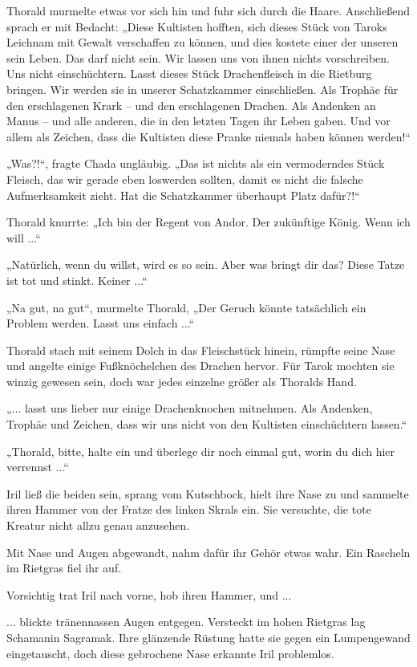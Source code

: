 Thorald murmelte etwas vor sich hin und fuhr sich durch die Haare. Anschließend sprach er mit Bedacht: „Diese Kultisten hofften, sich dieses Stück von Taroks Leichnam mit Gewalt verschaffen zu können, und dies kostete einer der unseren sein Leben. Das darf nicht sein. Wir lassen uns von ihnen nichts vorschreiben. Uns nicht einschüchtern. Lasst dieses Stück Drachenfleisch in die Rietburg bringen. Wir werden sie in unserer Schatzkammer einschließen. Als Trophäe für den erschlagenen Krark – und den erschlagenen Drachen. Als Andenken an Manus – und alle anderen, die in den letzten Tagen ihr Leben gaben. Und vor allem als Zeichen, dass die Kultisten diese Pranke niemals haben können werden!“

„Was?!“, fragte Chada ungläubig. „Das ist nichts als ein vermoderndes Stück Fleisch, das wir gerade eben loswerden sollten, damit es nicht die falsche Aufmerksamkeit zieht. Hat die Schatzkammer überhaupt Platz dafür?!“

Thorald knurrte: „Ich bin der Regent von Andor. Der zukünftige König. Wenn ich will ...“

„Natürlich, wenn du willst, wird es so sein. Aber was bringt dir das? Diese Tatze ist tot und stinkt. Keiner ...“

„Na gut, na gut“, murmelte Thorald, „Der Geruch könnte tatsächlich ein Problem werden. Lasst uns einfach ...“

Thorald stach mit seinem Dolch in das Fleischstück hinein, rümpfte seine Nase und angelte einige Fußknöchelchen des Drachen hervor. Für Tarok mochten sie winzig gewesen sein, doch war jedes einzelne größer als Thoralds Hand.

„... lasst uns lieber nur einige Drachenknochen mitnehmen. Als Andenken, Trophäe und Zeichen, dass wir uns nicht von den Kultisten einschüchtern lassen.“

„Thorald, bitte, halte ein und überlege dir noch einmal gut, worin du dich hier verrennst ...“

Iril ließ die beiden sein, sprang vom Kutschbock, hielt ihre Nase zu und sammelte ihren Hammer von der Fratze des linken Skrals ein. Sie versuchte, die tote Kreatur nicht allzu genau anzusehen.

Mit Nase und Augen abgewandt, nahm dafür ihr Gehör etwas wahr. Ein Rascheln im Rietgras fiel ihr auf.

Vorsichtig trat Iril nach vorne, hob ihren Hammer, und ...

... blickte tränennassen Augen entgegen. Versteckt im hohen Rietgras lag Schamanin Sagramak. Ihre glänzende Rüstung hatte sie gegen ein Lumpengewand eingetauscht, doch diese gebrochene Nase erkannte Iril problemlos.

